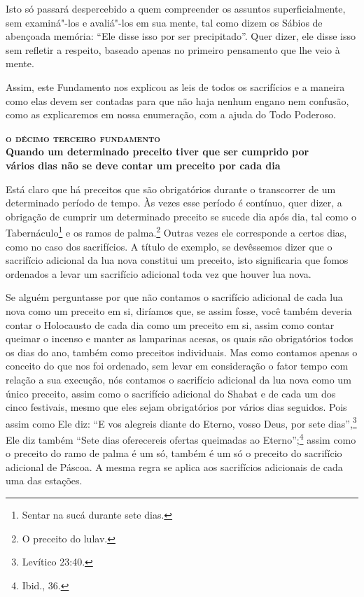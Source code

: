 Isto só passará despercebido a quem compreender os assuntos
superficialmente, sem examiná"-los e avaliá"-los em sua mente, tal como
dizem os Sábios de abençoada memória: ``Ele disse isso por ser
precipitado''. Quer dizer, ele disse isso sem refletir a respeito,
baseado apenas no primeiro pensamento que lhe veio à mente.

Assim, este Fundamento nos explicou as leis de todos os sacrifícios e a
maneira como elas devem ser contadas para que não haja nenhum engano nem
confusão, como as explicaremos em nossa enumeração, com a ajuda do Todo
Poderoso.


\bigskip

\noindent\textbf{\textsc{o décimo terceiro fundamento}\\Quando um determinado preceito tiver que ser cumprido por\\ vários dias não se deve contar um preceito por cada dia}

\smallskip

Está claro que há preceitos que são obrigatórios durante o transcorrer
de um determinado período de tempo. Às vezes esse período é contínuo,
quer dizer, a obrigação de cumprir um determinado preceito se sucede dia
após dia, tal como o Tabernáculo\footnote{Sentar na sucá\starr{} durante sete dias.} e os ramos de
palma.\footnote{O preceito do lulav\starr.} Outras vezes ele corresponde a certos dias,
como no caso dos sacrifícios. A título de exemplo, se devêssemos dizer
que o sacrifício adicional da lua nova constitui um preceito, isto
significaria que fomos ordenados a levar um sacrifício adicional toda
vez que houver lua nova.

Se alguém perguntasse por que não contamos o sacrifício adicional de
cada lua nova como um preceito em si, diríamos que, se assim fosse, você
também deveria contar o Holocausto de cada dia como um preceito em si,
assim como contar queimar o incenso e manter as lamparinas acesas, os
quais são obrigatórios todos os dias do ano, também como preceitos
individuais. Mas como contamos apenas o conceito do que nos foi
ordenado, sem levar em consideração o fator tempo com relação a sua
execução, nós contamos o sacrifício adicional da lua nova como um único
preceito, assim como o sacrifício adicional do Shabat e de cada um dos
cinco festivais, mesmo que eles sejam obrigatórios por vários dias
seguidos. Pois assim como Ele diz: ``E vos alegreis diante do Eterno,
vosso Deus, por sete dias'',\footnote{Levítico 23:40.} Ele diz também ``Sete dias
oferecereis ofertas queimadas ao Eterno'';\footnote{Ibid., 36.} assim como o
preceito do ramo de palma é um só, também é um só o preceito do
sacrifício adicional de Páscoa. A mesma regra se aplica aos sacrifícios
adicionais de cada uma das estações.

